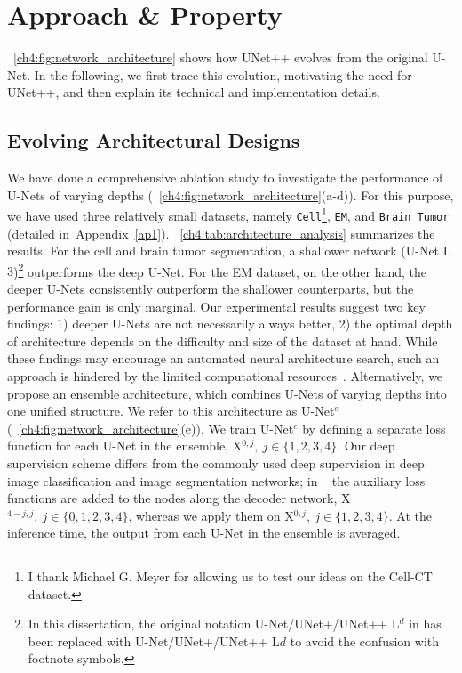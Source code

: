 \section{Approach \& Property}
\label{ch4:methods}

\figurename~\ref{ch4:fig:network_architecture} shows how UNet++ evolves from the original U-Net. In the following, we first trace this evolution, motivating the need for UNet++, and then explain its technical and implementation details.

\subsection{Evolving Architectural Designs}
\label{ch4:motiv}

We have done a comprehensive ablation study to investigate the performance of U-Nets of varying depths (\figurename~\ref{ch4:fig:network_architecture}(a-d)). For this purpose, we have used three relatively small datasets, namely \texttt{Cell}\footnote{I thank Michael G. Meyer for allowing us to test our ideas on the Cell-CT dataset.}, \texttt{EM}, and \texttt{Brain Tumor} (detailed in~Appendix~\ref{ap1}). \tableautorefname~\ref{ch4:tab:architecture_analysis} summarizes the results. For the cell and brain tumor segmentation, a shallower network (U-Net L$3$)\footnote{In this dissertation, the original notation U-Net/UNet+/UNet++ L$^{d}$ in \citet{zhou2018unet++,zhou2019unet++} has been replaced with U-Net/UNet+/UNet++ L${d}$ to avoid the confusion with footnote symbols.} outperforms the deep U-Net. For the EM dataset, on the other hand, the deeper U-Nets consistently outperform the shallower counterparts, but the  performance gain is only marginal. Our experimental results suggest two key findings: 1) deeper U-Nets are not necessarily always better, 2) the optimal depth of architecture depends on the difficulty and size of the dataset at hand. While these findings may encourage an automated neural architecture search, such an approach is hindered by the limited computational resources~\citep{liu2018progressive,zoph2018learning,liu2019auto,zhang2019customizable,li2019partial}. Alternatively, we propose an ensemble architecture, which combines  U-Nets of varying depths into one unified structure. We refer to this architecture as U-Net$^e$ (\figurename~\ref{ch4:fig:network_architecture}(e)). 
We train U-Net$^e$ by defining a separate loss function for each U-Net in the ensemble, \ie X$^{0,j},~j\in\{1,2,3,4\}$. Our deep supervision scheme differs from the commonly used deep supervision in deep image classification and image segmentation networks; in ~\citep{xie2015holistically,chen2016deep,dou20173d,lee2015deeply} the auxiliary loss functions are added to the nodes along the decoder network, \ie X$^{4-j,j},~j\in\{0,1,2,3,4\}$, whereas we apply them on X$^{0,j},~j\in\{1,2,3,4\}$. At the inference time, the output from each U-Net in the ensemble is averaged.


